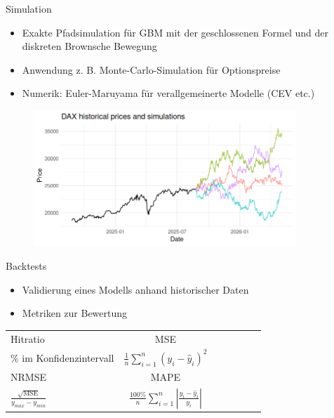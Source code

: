\documentclass{beamer}
\begin{document}
\begin{frame}{Simulation}
  \begin{itemize}
      \item Exakte Pfadsimulation für GBM mit der geschlossenen Formel und der diskreten Brownsche Bewegung
      \item Anwendung z. B. Monte-Carlo-Simulation für Optionspreise
      \item Numerik: Euler-Maruyama für verallgemeinerte Modelle (CEV etc.)
  \end{itemize}
  \begin{figure}
    \centering
  \includegraphics[width=0.88\textwidth]{../thesis/images/dax_sims_v2.png}
  \end{figure}
\end{frame}

\begin{frame}{Backtests}
  \begin{itemize}
      \item Validierung eines Modells anhand historischer Daten
      \item Metriken zur Bewertung
  \end{itemize}
\begin{table}[H]
\centering
\begin{tabular}{lcccccc}
Hitratio & MSE \\

\% im Konfidenzintervall & $\frac{1}{n} \sum_{i=1}^n (y_i - \hat{y}_i)^2$  \\
\hline
NRMSE & MAPE \\
$\frac{\sqrt{\text{MSE}}}{y_{max} - y_{min}}$ & $\frac{100\%}{n} \sum_{i=1}^n \left|\frac{y_i - \hat{y}_i}{y_i}\right|$ \\

\end{tabular}
\end{table}

\end{frame}
\end{document}
